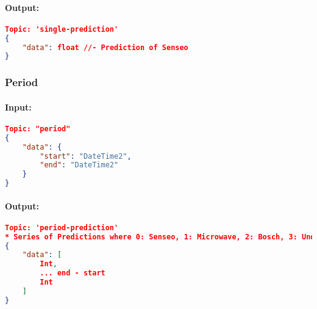             \paragraph{Output:}
        
            \begin{lstlisting}[language=json,firstnumber=1]
Topic: 'single-prediction'
{
    "data": float //- Prediction of Senseo
}
            \end{lstlisting}
    
        \subsubsection{Period}
            \paragraph{Input:}
    
                \begin{lstlisting}[language=json,firstnumber=1]
Topic: "period"
{
    "data": {
        "start": "DateTime2",
        "end": "DateTime2"
    }
}
                \end{lstlisting}
            
                \paragraph{Output:}
            
                \begin{lstlisting}[language=json,firstnumber=1]
Topic: 'period-prediction'
* Series of Predictions where 0: Senseo, 1: Microwave, 2: Bosch, 3: Undefined, for every second
{
    "data": [
        Int,
        ... end - start
        Int
    ]
}
                \end{lstlisting}
